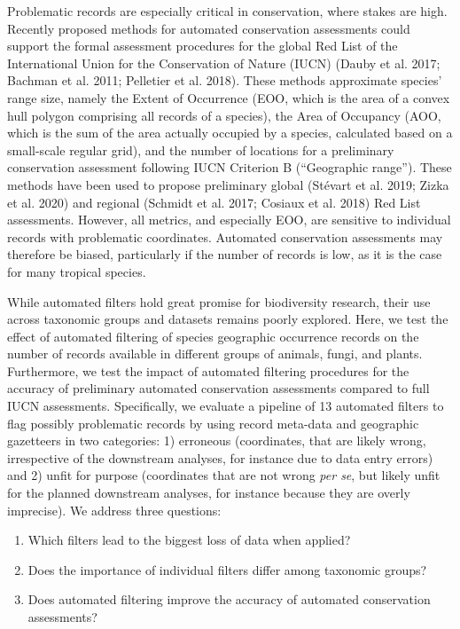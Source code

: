 \documentclass[fleqn,10pt,lineno]{wlpeerj} %
\providecommand{\tightlist}{
\setlength{\itemsep}{0pt}\setlength{\parskip}{0pt}}
\begin{document}
Problematic records are especially critical in conservation, where stakes are high. Recently proposed methods for automated conservation assessments could support the formal assessment procedures for the global Red List of the International Union for the Conservation of Nature (IUCN) (Dauby et al. 2017; Bachman et al. 2011; Pelletier et al. 2018). These methods approximate species' range size, namely the Extent of Occurrence (EOO, which is the area of a convex hull polygon comprising all records of a species), the Area of Occupancy (AOO, which is the sum of the area actually occupied by a species, calculated based on a small-scale regular grid), and the number of locations for a preliminary conservation assessment following IUCN Criterion B (``Geographic range''). These methods have been used to propose preliminary global (Stévart et al. 2019; Zizka et al. 2020) and regional (Schmidt et al. 2017; Cosiaux et al. 2018) Red List assessments. However, all metrics, and especially EOO, are sensitive to individual records with problematic coordinates. Automated conservation assessments may therefore be biased, particularly if the number of records is low, as it is the case for many tropical species.

While automated filters hold great promise for biodiversity research, their use across taxonomic groups and datasets remains poorly explored. Here, we test the effect of automated filtering of species geographic occurrence records on the number of records available in different groups of animals, fungi, and plants. Furthermore, we test the impact of automated filtering procedures for the accuracy of preliminary automated conservation assessments compared to full IUCN assessments. Specifically, we evaluate a pipeline of 13 automated filters to flag possibly problematic records by using record meta-data and geographic gazetteers in two categories: 1) erroneous (coordinates, that are likely wrong, irrespective of the downstream analyses, for instance due to data entry errors) and 2) unfit for purpose (coordinates that are not wrong \emph{per se}, but likely unfit for the planned downstream analyses, for instance because they are overly imprecise). We address three questions:

\begin{enumerate}
\def\labelenumi{\arabic{enumi}.}
\tightlist
\item
  Which filters lead to the biggest loss of data when applied?
\item
  Does the importance of individual filters differ among taxonomic groups?
\item
  Does automated filtering improve the accuracy of automated conservation assessments?
\end{enumerate}
\end{document}
